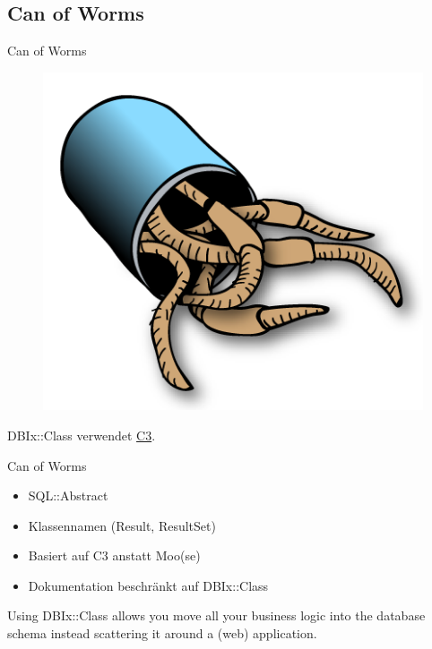 \subsection{Can of Worms}

\begin{frame}{Can of Worms}
\begin{figure}[!ht]
\centering
\includegraphics[width=0.75\linewidth]{img/canofworms.png}
\end{figure}
\end{frame}

DBIx::Class verwendet
\href{https://metacpan.org/pod/Class::C3::Componentised}{C3}.

\begin{frame}{Can of Worms}

\begin{itemize}
\item SQL::Abstract
\item Klassennamen (Result, ResultSet)
\item Basiert auf C3 anstatt Moo(se)
\item Dokumentation beschränkt auf DBIx::Class
\end{itemize}
\end{frame}

Using DBIx::Class allows you move all your business logic
into the database schema instead scattering it around a (web)
application.

